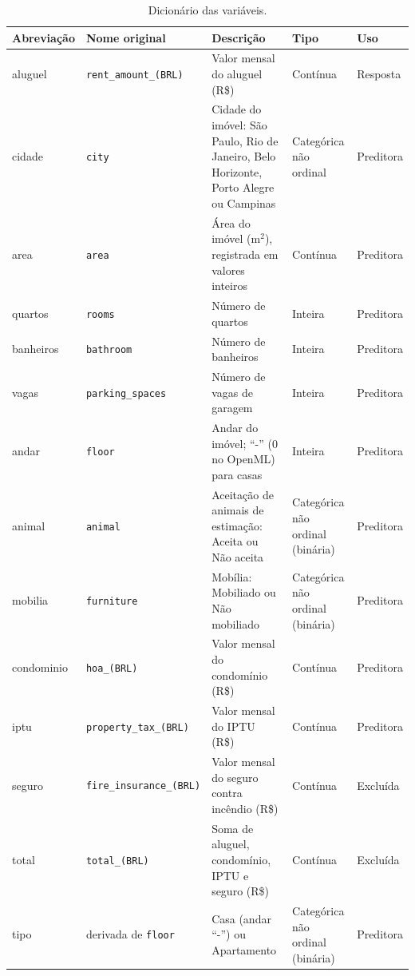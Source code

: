 \documentclass[12pt,a4paper]{article}
\begin{document}
\begin{table}[H]
\centering
\caption{Dicionário das variáveis.}
\label{tab:dicionario}
\footnotesize
\begin{tabular}{>{\raggedright\arraybackslash}p{1.85cm}
                >{\raggedright\arraybackslash}p{3.75cm}
                >{\raggedright\arraybackslash}p{4.35cm}
                >{\raggedright\arraybackslash}p{2.3cm}
                >{\raggedright\arraybackslash}p{1.6cm}}
\toprule
Abreviação & Nome original & Descrição & Tipo & Uso \\
\midrule
aluguel & \texttt{rent\_amount\_(BRL)} & Valor mensal do aluguel (R\$) & Contínua & Resposta \\
cidade & \texttt{city} & Cidade do imóvel: São Paulo, Rio de Janeiro, Belo Horizonte, Porto Alegre ou Campinas & Categórica não ordinal & Preditora \\
area & \texttt{area} & Área do imóvel (m$^2$), registrada em valores inteiros & Contínua & Preditora \\
quartos & \texttt{rooms} & Número de quartos & Inteira & Preditora \\
banheiros & \texttt{bathroom} & Número de banheiros & Inteira & Preditora \\
vagas & \texttt{parking\_spaces} & Número de vagas de garagem & Inteira & Preditora \\
andar & \texttt{floor} & Andar do imóvel; ``-'' (0 no OpenML) para casas & Inteira & Preditora \\
animal & \texttt{animal} & Aceitação de animais de estimação: Aceita ou Não aceita & Categórica não ordinal (binária) & Preditora \\
mobilia & \texttt{furniture} & Mobília: Mobiliado ou Não mobiliado & Categórica não ordinal (binária) & Preditora \\
condominio & \texttt{hoa\_(BRL)} & Valor mensal do condomínio (R\$) & Contínua & Preditora \\
iptu & \texttt{property\_tax\_(BRL)} & Valor mensal do IPTU (R\$) & Contínua & Preditora \\
seguro & \texttt{fire\_insurance\_(BRL)} & Valor mensal do seguro contra incêndio (R\$) & Contínua & Excluída \\
total & \texttt{total\_(BRL)} & Soma de aluguel, condomínio, IPTU e seguro (R\$) & Contínua & Excluída \\
\addlinespace
tipo & derivada de \texttt{floor} & Casa (andar ``-'') ou Apartamento & Categórica não ordinal (binária) & Preditora \\
\bottomrule
\end{tabular}
\end{table}
\end{document}
